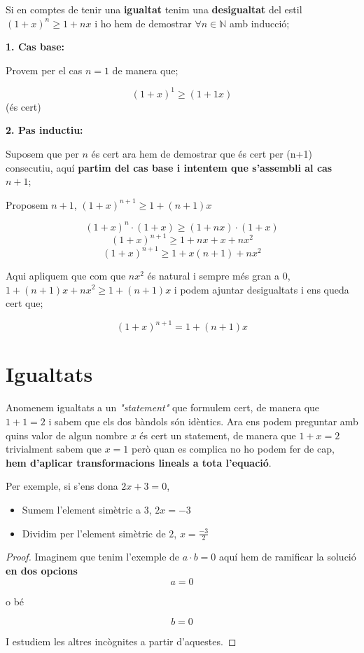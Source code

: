 \documentclass[12pt]{article}
\newcommand{\N}{\mathbb{N}}
\begin{document}
\begin{examplebox}{}
    Si en comptes de tenir una \textbf{igualtat} tenim una \textbf{desigualtat} del estil $(1+x)^n \geq 1+nx$ i ho hem de demostrar $\forall n \in \N$ amb inducció;

    \textbf{1. Cas base:}

    Provem per el cas $n = 1$ de manera que;

    \[(1+x)^1 \geq (1+1x)\](és cert)

    \textbf{2. Pas inductiu:}

    Suposem que per $n$ és cert ara hem de demostrar que és cert per (n+1) consecutiu, aquí \textbf{partim del cas base i intentem que s'assembli al cas $n+1$};

    Proposem $n+1$, $(1+x)^{n+1} \geq 1+ (n+1)x$

    \[(1+x)^n \cdot (1+x)\geq (1+nx) \cdot (1+x)\]
    \[(1+x)^{n+1} \geq 1 + nx + x + nx^2\]
    \[(1+x)^{n+1} \geq 1 + x(n+1) + nx^2\]

    Aqui apliquem que com que $nx^2$ és natural i sempre més gran a 0, $1+ (n+1)x + nx^2 \geq 1+ (n+1)x$ i podem ajuntar desigualtats i ens queda cert que;

    \[(1+x)^{n+1} = 1+ (n+1)x\]

\end{examplebox}


\section{Igualtats}

Anomenem igualtats a un \textit{"statement"} que formulem cert, de manera que $1+1=2$ i sabem que els dos bàndols són idèntics. Ara ens podem preguntar amb quins valor de algun nombre $x$ és cert un statement, de manera que $1+x = 2$ trivialment sabem que $x = 1$ però quan es complica no ho podem fer de cap, \textbf{hem d'aplicar transformacions lineals a tota l'equació}.

Per exemple, si s'ens dona $2x+3 = 0$,

\begin{itemize}
    \item Sumem l'element simètric a $3$, $2x = -3$
    \item Dividim per l'element simètric de $2$, $x = \frac{-3}{2}$
\end{itemize}

\begin{proof}
    Imaginem que tenim l'exemple de $a\cdot b = 0$ aquí hem de ramificar la solució \textbf{en dos opcions}
    \[a = 0\]
    \begin{center}
        o bé
    \end{center}
    \[b = 0\]
    
    I estudiem les altres incògnites a partir d'aquestes.
\end{proof}
\end{document}
